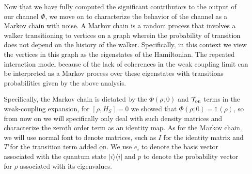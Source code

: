 \documentclass[
 amsmath,amssymb,
 aps,
onecolumn, 
nofootinbib]{revtex4-2}
\newcommand{\on}{\rm on}
\newcommand{\ketbra}[2]{| #1\rangle\! \langle #2|}
\newcommand{\identity}{\mathds{1}}
\begin{document}
Now that we have fully computed the significant contributors to the output of our channel $\Phi$, we move on to characterize the behavior of the channel as a Markov chain with noise. 
A Markov chain is a random process that involves a walker transitioning to vertices on a graph wherein the probability of transition does not depend on the history of the walker.  Specifically, in this context we view the vertices in this graph as the eigenstates of the Hamiltonian.  The repeated interaction model because of the lack of coherences in the weak coupling limit can be interpreted as a Markov process over these eigenstates with transitions probabilities given by the above analysis. 

Specifically, the Markov chain is dictated by the $\Phi(\rho; 0)$ and $\mathcal{T}_{\on}$ terms in the weak-coupling expansion, for $[\rho, H_S] = 0$ we showed that $\Phi(\rho; 0) = \identity(\rho)$, so from now on we will specifically only deal with such density matrices and characterize the zeroth order term as an identity map. As for the Markov chain, we will use normal font to denote matrices, such as $I$ for the identity matrix and $T$ for the transition term added on. We use $e_i$ to denote the basis vector associated with the quantum state $\ketbra{i}{i}$ and $p$ to denote the probability vector for $\rho$ associated with its eigenvalues.
\end{document}
